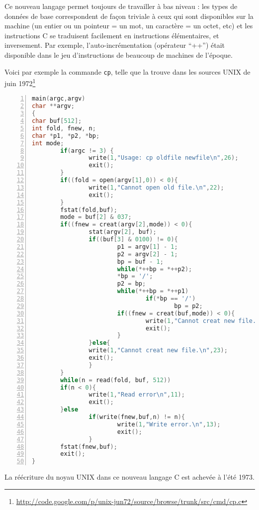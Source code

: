 \documentclass[10pt]{article}
\begin{document}
Ce nouveau langage permet toujours de travailler à bas niveau : les
types de données de base correspondent de façon triviale à ceux qui
sont disponibles sur la machine (un entier ou un pointeur = un mot, un
caractère = un octet, etc) et les instructions C se traduisent
facilement en instructions élémentaires, et inversement. Par exemple,
l'auto-incrémentation (opérateur ``++'') était disponible dans le jeu
d'instructions de beaucoup de machines de l'époque.


Voici par exemple la commande \texttt{cp}, telle que la trouve dans
les sources UNIX de juin 1972\footnote{
\url{http://code.google.com/p/unix-jun72/source/browse/trunk/src/cmd/cp.c}}

\begin{lstlisting}[frame=single,language=C,numbers=left]
main(argc,argv)
char **argv;
{
char buf[512];
int fold, fnew, n;
char *p1, *p2, *bp;
int mode;
        if(argc != 3) {
                write(1,"Usage: cp oldfile newfile\n",26);
                exit();
        }
        if((fold = open(argv[1],0)) < 0){
                write(1,"Cannot open old file.\n",22);
                exit();
        }
        fstat(fold,buf);
        mode = buf[2] & 037;
        if((fnew = creat(argv[2],mode)) < 0){
                stat(argv[2], buf);
                if((buf[3] & 0100) != 0){
                        p1 = argv[1] - 1;
                        p2 = argv[2] - 1;
                        bp = buf - 1;
                        while(*++bp = *++p2);
                        *bp = '/';
                        p2 = bp;
                        while(*++bp = *++p1)
                                if(*bp == '/')
                                        bp = p2;
                        if((fnew = creat(buf,mode)) < 0){
                                write(1,"Cannot creat new file.\n",23);
                                exit();
                        }
                }else{
                write(1,"Cannot creat new file.\n",23);
                exit();
                }
        }
        while(n = read(fold, buf, 512))
        if(n < 0){
                write(1,"Read error\n",11);
                exit();
        }else
                if(write(fnew,buf,n) != n){
                        write(1,"Write error.\n",13);
                        exit();
                }
        fstat(fnew,buf);
        exit();
}
\end{lstlisting}

La réécriture du noyau UNIX dans ce nouveau langage C est achevée à
l'été 1973.
\end{document}
